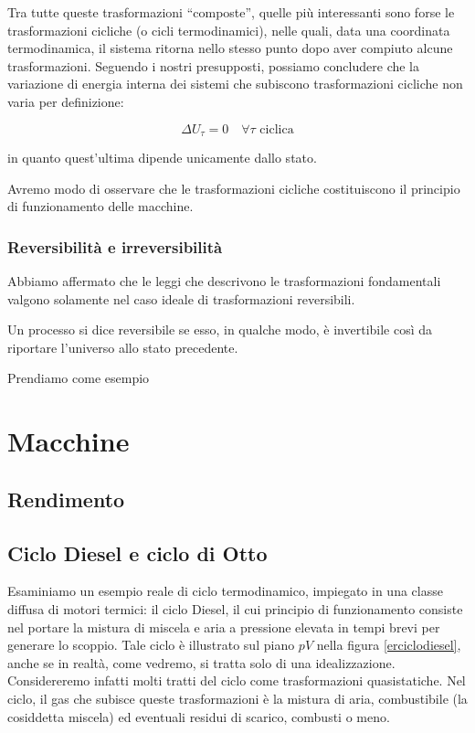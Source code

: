 Tra tutte queste trasformazioni ``composte'', quelle più interessanti
sono forse le trasformazioni cicliche (o cicli termodinamici), nelle
quali, data una coordinata termodinamica, il sistema ritorna nello stesso
punto dopo aver compiuto alcune trasformazioni. Seguendo i nostri presupposti,
possiamo concludere che la variazione di energia interna dei sistemi che
subiscono trasformazioni cicliche non varia per definizione:

\[ \Delta U_\tau = 0 \quad \forall \tau \text{ ciclica} \]

\noindent in quanto quest'ultima dipende unicamente dallo stato.

Avremo modo di osservare che le trasformazioni cicliche costituiscono
il principio di funzionamento delle macchine.


\subsubsection*{Reversibilità e irreversibilità}
Abbiamo affermato che le leggi che descrivono le trasformazioni fondamentali
valgono solamente nel caso ideale di trasformazioni reversibili.

\begin{tcolorbox}[colback = yellow!30, colframe = yellow!30!black, title = {Trasformazioni reversibili}]
    Un processo si dice reversibile se esso, in qualche modo, è
    invertibile così da riportare l'universo allo stato
    precedente.
\end{tcolorbox}

\noindent Prendiamo come esempio




\section{Macchine}

\subsection{Rendimento}


\subsection{Ciclo Diesel e ciclo di Otto}
Esaminiamo un esempio reale di ciclo termodinamico, impiegato in
una classe diffusa di motori termici: il ciclo Diesel, il cui
principio di funzionamento consiste nel portare la mistura di
miscela e aria a pressione elevata in tempi brevi per generare
lo scoppio. Tale ciclo
è illustrato sul piano $pV$ nella figura \ref{erciclodiesel}, anche
se in realtà, come vedremo, si tratta solo di una idealizzazione.
Considereremo infatti molti tratti del ciclo come trasformazioni
quasistatiche. Nel ciclo, il gas che subisce queste trasformazioni
è la mistura di aria, combustibile (la cosiddetta miscela) ed
eventuali residui di scarico, combusti o meno.

